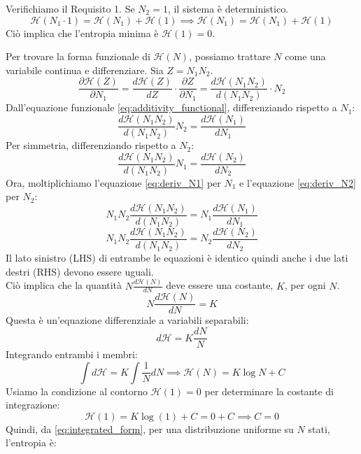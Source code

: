 \noindent Verifichiamo il Requisito 1. Se $N_2 = 1$, il sistema è deterministico.
\begin{equation}
    \mathcal{H}(N_1 \cdot 1) = \mathcal{H}(N_1) + \mathcal{H}(1) \implies \mathcal{H}(N_1) = \mathcal{H}(N_1) + \mathcal{H}(1)
\end{equation}  
Ciò implica che l'entropia minima è \textbf{$\mathcal{H}(1) = 0$}.

Per trovare la forma funzionale di $\mathcal{H}(N)$, possiamo trattare $N$ come una variabile continua e differenziare. Sia $Z = N_1 N_2$.
\begin{equation}
    \frac{\partial \mathcal{H}(Z)}{\partial N_1} = \frac{d \mathcal{H}(Z)}{d Z} \cdot \frac{\partial Z}{\partial N_1} = \frac{d \mathcal{H}(N_1 N_2)}{d (N_1 N_2)} \cdot N_2
\end{equation} 
Dall'equazione funzionale \eqref{eq:additivity_functional}, differenziando rispetto a $N_1$:
\begin{equation}
    \frac{d \mathcal{H}(N_1 N_2)}{d (N_1 N_2)} N_2 = \frac{d \mathcal{H}(N_1)}{d N_1}
    \label{eq:deriv_N1}
\end{equation}
Per simmetria, differenziando rispetto a $N_2$:
\begin{equation}
    \frac{d \mathcal{H}(N_1 N_2)}{d (N_1 N_2)} N_1 = \frac{d \mathcal{H}(N_2)}{d N_2}
    \label{eq:deriv_N2}
\end{equation}
Ora, moltiplichiamo l'equazione \eqref{eq:deriv_N1} per $N_1$ e l'equazione \eqref{eq:deriv_N2} per $N_2$:
\begin{equation}
    N_1 N_2 \frac{d \mathcal{H}(N_1 N_2)}{d (N_1 N_2)} = N_1 \frac{d \mathcal{H}(N_1)}{d N_1}
\end{equation}  
\begin{equation}
    N_1 N_2 \frac{d \mathcal{H}(N_1 N_2)}{d (N_1 N_2)} = N_2 \frac{d \mathcal{H}(N_2)}{d N_2}
\end{equation} 
Il lato sinistro (LHS) di entrambe le equazioni è identico quindi anche i due lati destri (RHS) devono essere uguali.\\
Ciò implica che la quantità $N \frac{d\mathcal{H}(N)}{dN}$ deve essere una costante, $K$, per ogni $N$.
\begin{equation}
    N \frac{d\mathcal{H}(N)}{dN} = K
    \label{eq:N_H_const}
\end{equation}
Questa è un'equazione differenziale a variabili separabili:
\begin{equation}
    d\mathcal{H} = K \frac{dN}{N} 
\end{equation} 
Integrando entrambi i membri:
\begin{equation}
    \int d\mathcal{H} = K \int \frac{1}{N} dN \implies \mathcal{H}(N) = K \log N + C
    \label{eq:integrated_form}
\end{equation}
Usiamo la condizione al contorno $\mathcal{H}(1) = 0$ per determinare la costante di integrazione:
\begin{equation}
    \mathcal{H}(1) = K \log(1) + C = 0 + C \implies C = 0
\end{equation} 
Quindi, da \eqref{eq:integrated_form}, per una distribuzione uniforme su $N$ stati, l'entropia è:

